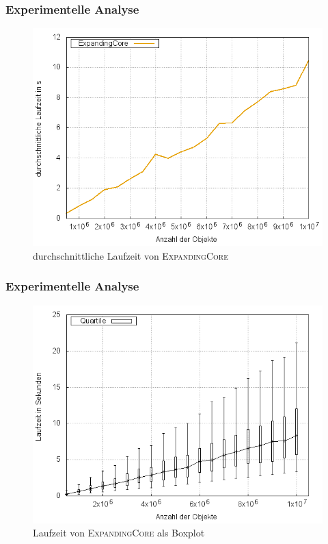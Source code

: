 \documentclass{presentation}
\begin{document}
\begin{frame}
    \frametitle{Experimentelle Analyse}
    \begin{figure}[!htb]
        \centering
        \includegraphics[scale=0.4]{res/core_time_average.png}
        \caption{durchschnittliche Laufzeit von \textsc{ExpandingCore}}
        \label{fig:core_time_average}
    \end{figure}
\end{frame}



\begin{frame}
    \frametitle{Experimentelle Analyse}
    \begin{figure}[!htb]
        \centering
        \includegraphics[scale=0.4]{res/core_time.png}
        \caption{Laufzeit von \textsc{ExpandingCore} als Boxplot}
        \label{fig:core_time}
    \end{figure}
\end{frame}
\end{document}
